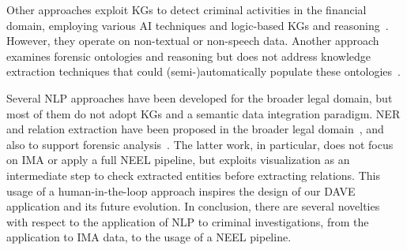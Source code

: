  
Other approaches exploit KGs to detect criminal activities in the financial domain, employing various AI techniques and logic-based KGs and reasoning~\cite{alhajeri2023using,bellomarini2020rule}. However, they operate on non-textual or non-speech data. 
Another approach examines forensic ontologies and reasoning but does not address knowledge extraction techniques that could (semi-)automatically populate these ontologies~\cite{spyropoulos2023interoperability}.

      


Several NLP approaches have been developed for the broader legal domain, but most of them do not adopt KGs and a semantic data integration paradigm.
NER and relation extraction have been proposed in the broader legal domain~\cite{zhong2020does}, and also to support forensic analysis~\cite{IE-forensic-2015}. The latter work, in particular, does not focus on IMA or apply a full NEEL pipeline, but exploits visualization as an intermediate step to check extracted entities before extracting relations. This usage of a human-in-the-loop approach inspires the design of our DAVE application and its future evolution. %
In conclusion, there are several novelties with respect to the application of NLP to criminal investigations, from the application to IMA data, to the usage of a NEEL pipeline.  

